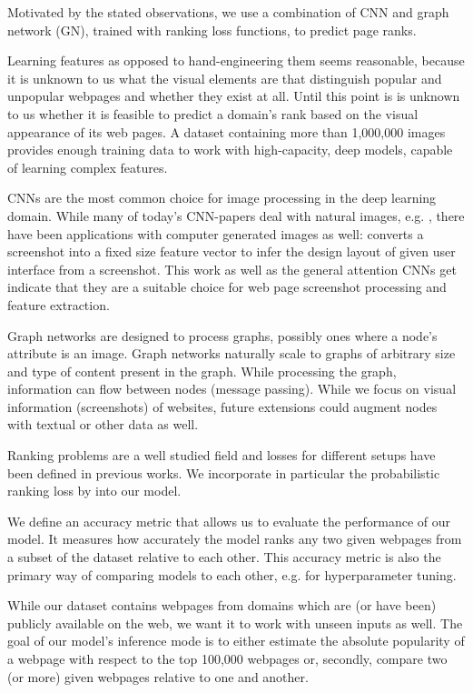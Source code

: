 Motivated by the stated observations, we use a combination of CNN and graph network (GN), trained with ranking loss functions, to predict page ranks.

Learning features as opposed to hand-engineering them seems reasonable, because it is unknown to us what the visual elements are that distinguish popular and unpopular webpages and whether they exist at all. Until this point is is unknown to us whether it is feasible to predict a domain's rank based on the visual appearance of its web pages. A dataset containing more than 1,000,000 images provides enough training data to work with high-capacity, deep models, capable of learning complex features.

CNNs are the most common choice for image processing in the deep learning domain. While many of today's CNN-papers deal with natural images, e.g. \cite{gu2018ava,szegedy2017inception,openai:learningdexterity}, there have been applications with computer generated images as well: \cite{beltramelli:pix2code} converts a screenshot into a fixed size feature vector to infer the design layout of given user interface from a screenshot. This work as well as the general attention CNNs get indicate that they are a suitable choice for web page screenshot processing and feature extraction.

Graph networks are designed to process graphs, possibly ones where a node's attribute is an image. Graph networks naturally scale to graphs of arbitrary size and type of content present in the graph. While processing the graph, information can flow between nodes (message passing). While we focus on visual information (screenshots) of websites, future extensions could augment nodes with textual or other data as well.

Ranking problems are a well studied field and losses for different setups have been defined in previous works. We incorporate in particular the probabilistic ranking loss by \cite{Burges:learningtorankwithsgd} into our model.

We define an accuracy metric that allows us to evaluate the performance of our model. It measures how accurately the model ranks any two given webpages from a subset of the dataset relative to each other. This accuracy metric is also the primary way of comparing models to each other, e.g. for hyperparameter tuning.

While our dataset contains webpages from domains which are (or have been) publicly available on the web, we want it to work with unseen inputs as well. The goal of our model's inference mode is to either estimate the absolute popularity of a webpage with respect to the top 100,000 webpages or, secondly, compare two (or more) given webpages relative to one and another.


